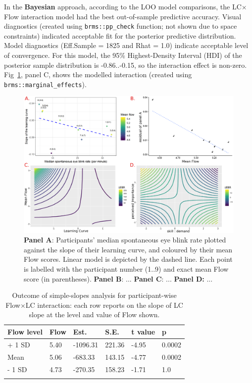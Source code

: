 \documentclass[10pt,letterpaper,floatsintext]{article}
\begin{document}

In the \textbf{Bayesian} approach, according to the LOO model comparisons, the LC$\times$Flow interaction model had the best out-of-sample predictive accuracy. Visual diagnostics (created using \verb|brms::pp_check| function; not shown due to space constraints) indicated acceptable fit for the posterior predictive distribution. Model diagnostics (Eff.Sample = 1825 and Rhat = 1.0) indicate acceptable level of convergence. For this model, the 95\% Highest-Density Interval (HDI) of the posterior sample distribution is -0.86..-0.15, so the interaction effect is non-zero. Fig~\ref{fig:EBRvLC}, panel C, shows the modelled interaction (created using \verb|brms::marginal_effects|).

\begin{figure}[!t]
	\centering
	\includegraphics[width=\textwidth]{sEBR_RQ1-2_results}
	\caption{\textbf{Panel A}: Participants' median spontaneous eye blink rate plotted against the slope of their learning curve, and coloured by their mean Flow scores. Linear model is depicted by the dashed line. Each point is labelled with the participant number (1..9) and exact mean Flow score (in parentheses). \textbf{Panel B}: ... \textbf{Panel C}: ... \textbf{Panel D:} ...}
	\label{fig:EBRvLC}
\end{figure}


\begin{table}[!hb]
\centering
\caption{Outcome of simple-slopes analysis for participant-wise Flow$\times$LC interaction: each row reports on the slope of LC slope at the level and value of Flow shown.}
\begin{tabular}{llllll}
\hline
Flow level & Flow & Est. & S.E. & t value & p \\
\hline
+ 1 SD & 5.40 & -1096.31 & 221.36 & -4.95 & 0.0002 \\
Mean   & 5.06 &  -683.33 & 143.15 & -4.77 & 0.0002 \\
- 1 SD & 4.73 &  -270.35 & 158.23 & -1.71 & 1.0 \\
\hline
\label{tab:simpslopes}
\end{tabular}
\end{table}
\end{document}
